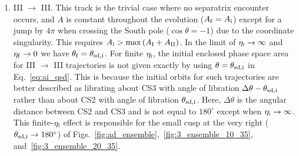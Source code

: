 \begin{enumerate}
    \item III $\to$ III\@. This track is the trivial case where no separatrix
        encounter occurs, and $A$ is constant throughout the evolution ($A_{\rm
        f} = A_{\rm i}$) except for a jump by $4\pi$ when crossing the South
        pole ($\cos \theta = -1$) due to the coordinate singularity. This
        requires $A_{\rm i} > \max \left(A_{\rm I} + A_{\rm II}\right)$. In the limit of
        $\eta_{\rm i} \to \infty$ and $ \eta_{\rm f} \to 0$ we have $\theta_{\rm
        f} = \theta_{\rm sd, i}$. For finite $\eta_{\rm i}$, the initial
        enclosed phase space area for III $\to$ III trajectories is not given
        exactly by using $\theta = \theta_{\rm sd, i}$ in Eq.~\eqref{eq:ai_qsd}.
        This is because the initial orbits for such trajectories are better
        described as librating about CS3 with angle of libration $\Delta \theta
        - \theta_{\rm sd, i}$ rather than about CS2 with angle of libration
        $\theta_{\rm sd, i}$. Here, $\Delta \theta$ is the angular distance
        between CS2 and CS3 and is not equal to $180^\circ$ except when
        $\eta_{\rm i} \to \infty$. This finite-$\eta_{\rm i}$ effect is
        responsible for the small cusp at the very right ($\theta_{\rm sd, i}
        \to 180^\circ$) of
        Figs.~\ref{fig:ad_ensemble},~\ref{fig:3_ensemble_10_35},
        and~\ref{fig:3_ensemble_20_35}.
\end{enumerate}

